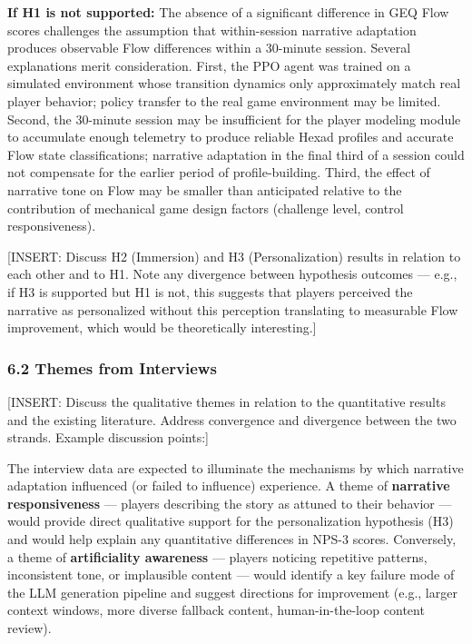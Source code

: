 \textbf{If H1 is not supported:} The absence of a significant difference
in GEQ Flow scores challenges the assumption that within-session
narrative adaptation produces observable Flow differences within a
30-minute session. Several explanations merit consideration. First, the
PPO agent was trained on a simulated environment whose transition
dynamics only approximately match real player behavior; policy transfer
to the real game environment may be limited. Second, the 30-minute
session may be insufficient for the player modeling module to accumulate
enough telemetry to produce reliable Hexad profiles and accurate Flow
state classifications; narrative adaptation in the final third of a
session could not compensate for the earlier period of profile-building.
Third, the effect of narrative tone on Flow may be smaller than
anticipated relative to the contribution of mechanical game design
factors (challenge level, control responsiveness).

{[}INSERT: Discuss H2 (Immersion) and H3 (Personalization) results in
relation to each other and to H1. Note any divergence between hypothesis
outcomes --- e.g., if H3 is supported but H1 is not, this suggests that
players perceived the narrative as personalized without this perception
translating to measurable Flow improvement, which would be theoretically
interesting.{]}

\subsubsection{6.2 Themes from Interviews}\label{themes-from-interviews}

{[}INSERT: Discuss the qualitative themes in relation to the
quantitative results and the existing literature. Address convergence
and divergence between the two strands. Example discussion points:{]}

The interview data are expected to illuminate the mechanisms by which
narrative adaptation influenced (or failed to influence) experience. A
theme of \textbf{narrative responsiveness} --- players describing the
story as attuned to their behavior --- would provide direct qualitative
support for the personalization hypothesis (H3) and would help explain
any quantitative differences in NPS-3 scores. Conversely, a theme of
\textbf{artificiality awareness} --- players noticing repetitive
patterns, inconsistent tone, or implausible content --- would identify a
key failure mode of the LLM generation pipeline and suggest directions
for improvement (e.g., larger context windows, more diverse fallback
content, human-in-the-loop content review).


